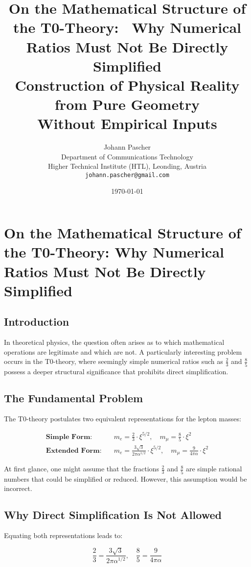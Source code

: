 \documentclass[12pt,a4paper]{article}
\title{\textbf{On the Mathematical Structure of the T0-Theory: \ Why Numerical Ratios Must Not Be Directly Simplified}\\[0.5cm]
	\large Construction of Physical Reality from Pure Geometry\\[0.3cm]
	\normalsize Without Empirical Inputs}
\author{Johann Pascher\\
	Department of Communications Technology\\
	Higher Technical Institute (HTL), Leonding, Austria\\
	\texttt{johann.pascher@gmail.com}}
\date{\today}
\begin{document}
	\maketitle
	\tableofcontents
	\newpage	
	\section*{On the Mathematical Structure of the T0-Theory: Why Numerical Ratios Must Not Be Directly Simplified}
	
	\subsection*{Introduction}
	
	In theoretical physics, the question often arises as to which mathematical operations are legitimate and which are not. A particularly interesting problem occurs in the T0-theory, where seemingly simple numerical ratios such as \(\frac{2}{3}\) and \(\frac{8}{5}\) possess a deeper structural significance that prohibits direct simplification.
	
	\subsection*{The Fundamental Problem}
	
	The T0-theory postulates two equivalent representations for the lepton masses:
	
	\begin{align*}
		\textbf{Simple Form:} &\quad m_e = \frac{2}{3} \cdot \xi^{5/2}, \quad m_\mu = \frac{8}{5} \cdot \xi^2 \\
		\textbf{Extended Form:} &\quad m_e = \frac{3\sqrt{3}}{2\pi\alpha^{1/2}} \cdot \xi^{5/2}, \quad m_\mu = \frac{9}{4\pi\alpha} \cdot \xi^2
	\end{align*}
	
	At first glance, one might assume that the fractions \(\frac{2}{3}\) and \(\frac{8}{5}\) are simple rational numbers that could be simplified or reduced. However, this assumption would be incorrect.
	
	\subsection*{Why Direct Simplification Is Not Allowed}
	
	Equating both representations leads to:
	
	\[
	\frac{2}{3} = \frac{3\sqrt{3}}{2\pi\alpha^{1/2}}, \quad \frac{8}{5} = \frac{9}{4\pi\alpha}
	\]
	
\end{document}
